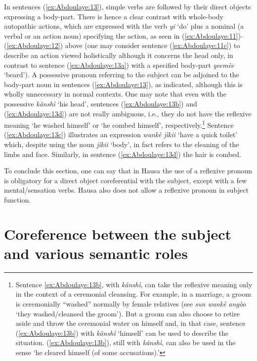 \documentclass[output=paper]{langscibook}
\begin{document}
In sentences (\ref{ex:Abdoulaye:13}), simple verbs are followed by their direct objects expressing a body-part. There is hence a clear contrast with whole-body autopathic actions, which are expressed with the verb \textit{yi} ‘do’ plus a nominal (a verbal or an action noun) specifying the action, as seen in (\ref{ex:Abdoulaye:11})--(\ref{ex:Abdoulaye:12}) above (one may consider sentence (\ref{ex:Abdoulaye:11c}) to describe an action viewed holistically although it concerns the head only, in contrast to sentence (\ref{ex:Abdoulaye:13a}) with a specified body-part \textit{geemèe} ‘beard’). A possessive pronoun referring to the subject can be adjoined to the body-part noun in sentences (\ref{ex:Abdoulaye:13}), as indicated, although this is wholly unnecessary in normal contexts. One may note that even with the possessive \textit{kânshì} ‘his head’, sentences (\ref{ex:Abdoulaye:13b}) and (\ref{ex:Abdoulaye:13d}) are not really ambiguous, i.e., they do not have the reflexive meaning ‘he washed himself’ or ‘he combed himself’, respectively.\footnote{Sentence \ref{ex:Abdoulaye:13b}, with \textit{kânshì}, can take the reflexive meaning only in the context of a ceremonial cleansing. For example, in a marriage, a groom is ceremonially “washed” normally by female relatives (see \textit{sun} \textit{wankè} \textit{angòo} ‘they washed/cleansed the groom’). But a groom can also choose to retire aside and throw the ceremonial water on himself and, in that case, sentence (\ref{ex:Abdoulaye:13b}) with \textit{kânshì} ‘himself’ can be used to describe the situation. (\ref{ex:Abdoulaye:13b}), still with \textit{kânshì}, can also be used in the sense ‘he cleared himself (of some accusations).’}  Sentence (\ref{ex:Abdoulaye:13c}) illustrates an expression \textit{wankè} \textit{jìkii} ‘have a quick toilet’ which, despite using the noun \textit{jìkii} ‘body’, in fact refers to the cleaning of the limbs and face. Similarly, in sentence (\ref{ex:Abdoulaye:13d}) the hair is combed.

To conclude this section, one can say that in Hausa the use of a reflexive pronoun is obligatory for a direct object coreferential with the subject, except with a few mental/sensation verbs. Hausa also does not allow a reflexive pronoun in subject function.

\section{Coreference between the subject and various semantic roles} \label{sec:Abdoulaye:4}
\end{document}

